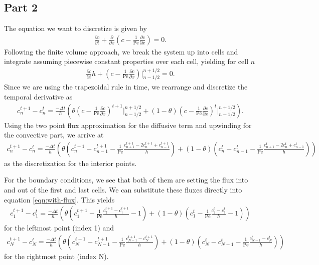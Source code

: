 \documentclass{article}
\begin{document}
\subsection{Part 2}
The equation we want to discretize is given by
\begin{align}
    \frac{\partial c}{\partial t} + \frac{\partial}{\partial x} \left(c - \frac{1}{\mathrm{Pe}} \frac{\partial c}{\partial x} \right) = 0.
\end{align}
Following the finite volume approach, we break the system up into cells and integrate assuming piecewise constant properties over each cell, yielding for cell $n$
\begin{align}
    \frac{\partial c}{\partial t} h  + \left( c - \frac{1}{\mathrm{Pe}} \frac{\partial c}{\partial x} \right)\biggr\rvert^{n+1/2}_{n-1/2}  = 0.
\end{align}
Since we are using the trapezoidal rule in time, we rearrange and discretize the temporal derivative as
\begin{align}
c^{t+1}_{n} - c^{t}_{n} = \frac{-\Delta t}{h}\left( \theta \left(c - \frac{1}{\mathrm{Pe}} \frac{\partial c}{\partial x} \right)^{t+1}\biggr\rvert^{n+1/2}_{n-1/2} + (1 - \theta) \left(c - \frac{1}{\mathrm{Pe}} \frac{\partial c}{\partial x} \right)^{t}\biggr\rvert^{n+1/2}_{n-1/2} \right).
\label{eqn:with-flux}
\end{align}
Using the two point flux approximation for the diffusive term and upwinding for the convective part, we arrive at
\begin{align}
c^{t+1}_{n} - c^{t}_{n} = \frac{-\Delta t}{h}\left( \theta \left(c^{t+1}_n - c^{t+1}_{n-1} - \frac{1}{\mathrm{Pe}} \frac{c^{t+1}_{n+1} - 2c^{t+1}_{n} + c^{t+1}_{n-1}}{h} \right) + (1 - \theta) \left(c^t_{n} - c^{t}_{n-1} - \frac{1}{\mathrm{Pe}} \frac{c^{t}_{n+1} - 2c^{t}_{n} + c^{t}_{n-1}}{h} \right) \right)
\end{align}
as the discretization for the interior points.

For the boundary conditions, we see that both of them are setting the flux into and out of the first and last cells.
We can substitute these fluxes directly into equation \eqref{eqn:with-flux}.
This yields
\begin{align}
c^{t+1}_{1} - c^{t}_{1} = \frac{-\Delta t}{h}\left( \theta \left(c^{t+1}_{1} - \frac{1}{\mathrm{Pe}} \frac{c^{t+1}_{2} - c^{t+1}_{1}}{h} - 1 \right) + (1 - \theta) \left( c^{t}_{1} - \frac{1}{\mathrm{Pe}} \frac{c^{t}_{2} - c^{t}_{1}}{h} - 1 \right) \right)
\end{align}
for the leftmost point (index 1)  and
\begin{align}
c^{t+1}_{N} - c^{t}_{N} = \frac{-\Delta t}{h}\left( \theta \left(c^{t+1}_{N} - c^{t+1}_{N-1} - \frac{1}{\mathrm{Pe}} \frac{c^{t+1}_{N-1} - c^{t+1}_{N}}{h} \right) + (1 - \theta) \left( c^{t}_{N} - c^{t}_{N-1} - \frac{1}{\mathrm{Pe}} \frac{c^{t}_{N-1} - c^{t}_{N}}{h} \right) \right)
\end{align}
for the rightmost point (index N).

% 
\end{document}
